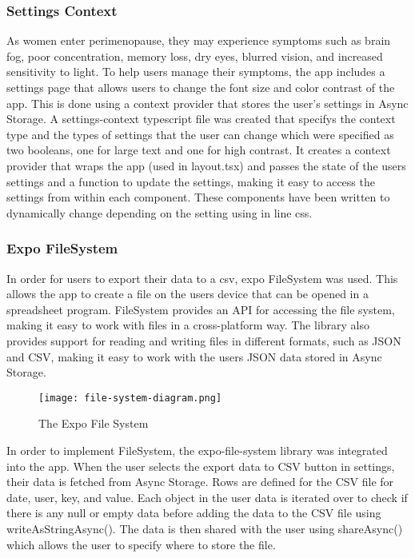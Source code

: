 \subsubsection{Settings Context}
As women enter perimenopause, they may experience symptoms such as brain fog, poor concentration, memory loss, dry eyes, blurred vision, and increased sensitivity to light. To help users manage their symptoms, the app includes a settings page that allows users to change the font size and color contrast of the app. This is done using a context provider that stores the user's settings in Async Storage. A settings-context typescript file was created that specifys the context type and the types of settings that the user can change which were specified as two booleans, one for large text and one for high contrast. It creates a context provider that wraps the app (used in layout.tsx) and passes the state of the users settings and a function to update the settings, making it easy to access the settings from within each component. These components have been written to dynamically change depending on the setting using in line css. 

\subsubsection{Expo FileSystem}
In order for users to export their data to a csv, expo FileSystem was used. This allows the app to create a file on the users device that can be opened in a spreadsheet program. FileSystem provides an API for accessing the file system, making it easy to work with files in a cross-platform way. The library also provides support for reading and writing files in different formats, such as JSON and CSV, making it easy to work with the users JSON data stored in Async Storage.

\begin{figure}[h!!]
    \begin{center}
      \texttt{[image: file-system-diagram.png]}
      \caption{The Expo File System\cite{ExpoFileSystem2025}}
      \label{figure:file-system-diagram}
    \end{center}
  \end{figure}

In order to implement FileSystem, the expo-file-system library was integrated into the app. When the user selects the export data to CSV button in settings, their data is fetched from Async Storage. Rows are defined for the CSV file for date, user, key, and value. Each object in the user data is iterated over to check if there is any null or empty data before adding the data to the CSV file using writeAsStringAsync(). The data is then shared with the user using shareAsync() which allows the user to specify where to store the file.

